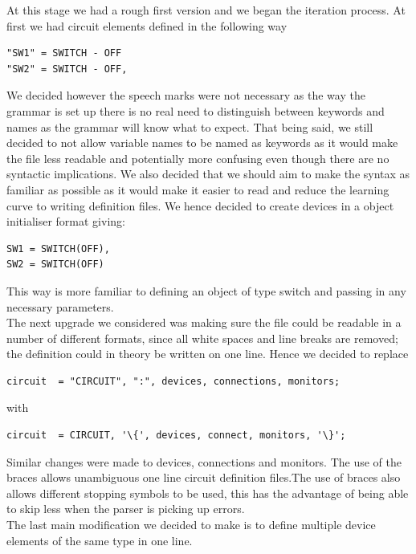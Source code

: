 \documentclass[10pt]{article}
\begin{document}
At this stage we had a rough first version and we began the iteration process.  At first we had circuit elements defined in the following way 

\begin{verbatim}
"SW1" = SWITCH - OFF
"SW2" = SWITCH - OFF,
\end{verbatim}

We decided however the speech marks were not necessary as the way the grammar is set up there is no real need to distinguish between keywords and names as the grammar will know what to expect. That being said, we still decided to not allow variable names to be named as keywords as it would make the file less readable and potentially more confusing even though there are no syntactic implications. We also decided that we should aim to make the syntax as familiar as possible as it would make it easier to read and reduce the learning curve to writing definition files. We hence decided to create devices in a object initialiser format giving: 

\begin{verbatim}
SW1 = SWITCH(OFF),
SW2 = SWITCH(OFF)
\end{verbatim}

This way is more familiar to defining an object of type switch and passing in any necessary parameters. \\

The next upgrade we considered was making sure the file could be readable in a number of different formats, since all white spaces and line breaks are removed; the definition could in theory be written on one line. Hence we decided to replace

\begin{verbatim}
circuit  = "CIRCUIT", ":", devices, connections, monitors;
\end{verbatim}

with

\begin{verbatim}
circuit  = CIRCUIT, '\{', devices, connect, monitors, '\}';
\end{verbatim}

Similar changes were made to devices, connections and monitors. The use of the braces allows unambiguous one line circuit definition files.The use of braces also allows different stopping symbols to be used, this has the advantage of being able to skip less when the parser is picking up errors.\\

The last main modification we decided to make is to define multiple device elements of the same type in one line.
\end{document}

